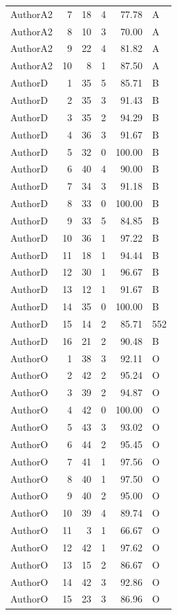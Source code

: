 \begin{longtable}{lrrrrl}
AuthorA2 & 7 & 18 & 4 & 77.78 & A\\
AuthorA2 & 8 & 10 & 3 & 70.00 & A\\
AuthorA2 & 9 & 22 & 4 & 81.82 & A\\
AuthorA2 & 10 & 8 & 1 & 87.50 & A\\
AuthorD & 1 & 35 & 5 & 85.71 & B\\
AuthorD & 2 & 35 & 3 & 91.43 & B\\
AuthorD & 3 & 35 & 2 & 94.29 & B\\
AuthorD & 4 & 36 & 3 & 91.67 & B\\
AuthorD & 5 & 32 & 0 & 100.00 & B\\
AuthorD & 6 & 40 & 4 & 90.00 & B\\
AuthorD & 7 & 34 & 3 & 91.18 & B\\
AuthorD & 8 & 33 & 0 & 100.00 & B\\
AuthorD & 9 & 33 & 5 & 84.85 & B\\
AuthorD & 10 & 36 & 1 & 97.22 & B\\
AuthorD & 11 & 18 & 1 & 94.44 & B\\
AuthorD & 12 & 30 & 1 & 96.67 & B\\
AuthorD & 13 & 12 & 1 & 91.67 & B\\
AuthorD & 14 & 35 & 0 & 100.00 & B\\
AuthorD & 15 & 14 & 2 & 85.71 & 552\\
AuthorD & 16 & 21 & 2 & 90.48 & B\\
AuthorO & 1 & 38 & 3 & 92.11 & O\\
AuthorO & 2 & 42 & 2 & 95.24 & O\\
AuthorO & 3 & 39 & 2 & 94.87 & O\\
AuthorO & 4 & 42 & 0 & 100.00 & O\\
AuthorO & 5 & 43 & 3 & 93.02 & O\\
AuthorO & 6 & 44 & 2 & 95.45 & O\\
AuthorO & 7 & 41 & 1 & 97.56 & O\\
AuthorO & 8 & 40 & 1 & 97.50 & O\\
AuthorO & 9 & 40 & 2 & 95.00 & O\\
AuthorO & 10 & 39 & 4 & 89.74 & O\\
AuthorO & 11 & 3 & 1 & 66.67 & O\\
AuthorO & 12 & 42 & 1 & 97.62 & O\\
AuthorO & 13 & 15 & 2 & 86.67 & O\\
AuthorO & 14 & 42 & 3 & 92.86 & O\\
AuthorO & 15 & 23 & 3 & 86.96 & O\\

\end{longtable}
